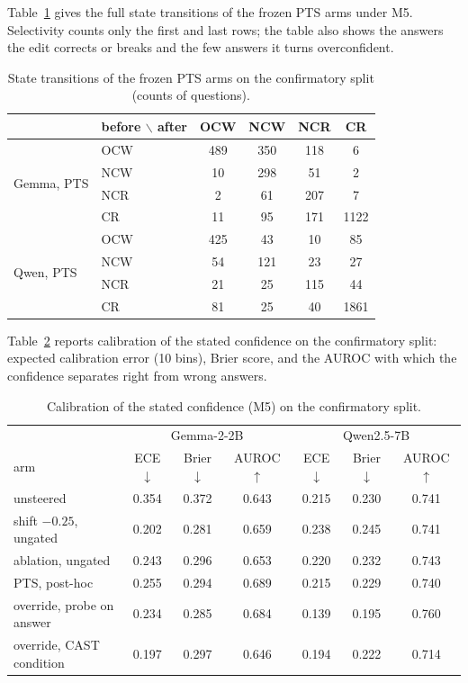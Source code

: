Table~\ref{tab:transitions} gives the full state transitions of the frozen
PTS arms under M5. Selectivity counts only the first and last rows; the table
also shows the answers the edit corrects or breaks and the few answers it turns
overconfident.

\begin{table}[h]\footnotesize\setlength{\tabcolsep}{5pt}
\centering
\begin{tabular}{ll|cccc}
\hline
 & before $\backslash$ after & OCW & NCW & NCR & CR \\
\hline
\multirow{4}{*}{Gemma, PTS} & OCW & 489 & 350 & 118 & 6 \\
 & NCW & 10 & 298 & 51 & 2 \\
 & NCR & 2 & 61 & 207 & 7 \\
 & CR & 11 & 95 & 171 & 1122 \\
\hline
\multirow{4}{*}{Qwen, PTS} & OCW & 425 & 43 & 10 & 85 \\
 & NCW & 54 & 121 & 23 & 27 \\
 & NCR & 21 & 25 & 115 & 44 \\
 & CR & 81 & 25 & 40 & 1861 \\
\hline
\end{tabular}
\caption{State transitions of the frozen PTS arms on the confirmatory split
(counts of questions).}
\label{tab:transitions}
\end{table}

Table~\ref{tab:calibration} reports calibration of the stated confidence on
the confirmatory split: expected calibration error (10 bins), Brier score, and
the AUROC with which the confidence separates right from wrong answers.

\begin{table}[h]\footnotesize\setlength{\tabcolsep}{4pt}
\centering
\begin{tabular}{l|ccc|ccc}
\hline
 & \multicolumn{3}{c|}{Gemma-2-2B} & \multicolumn{3}{c}{Qwen2.5-7B} \\
arm & ECE $\downarrow$ & Brier $\downarrow$ & AUROC $\uparrow$ & ECE $\downarrow$ & Brier $\downarrow$ & AUROC $\uparrow$ \\
\hline
unsteered & 0.354 & 0.372 & 0.643 & 0.215 & 0.230 & 0.741 \\
shift $-0.25$, ungated & 0.202 & 0.281 & 0.659 & 0.238 & 0.245 & 0.741 \\
ablation, ungated & 0.243 & 0.296 & 0.653 & 0.220 & 0.232 & 0.743 \\
PTS, post-hoc & 0.255 & 0.294 & 0.689 & 0.215 & 0.229 & 0.740 \\
override, probe on answer & 0.234 & 0.285 & 0.684 & 0.139 & 0.195 & 0.760 \\
override, CAST condition & 0.197 & 0.297 & 0.646 & 0.194 & 0.222 & 0.714 \\
\hline
\end{tabular}
\caption{Calibration of the stated confidence (M5) on the confirmatory split.}
\label{tab:calibration}
\end{table}

